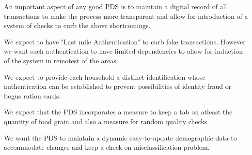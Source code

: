 \documentclass[a4paper,12pt,openany]{book}
\begin{document}
An important aspect of any good PDS is to maintain a digital record of all transactions to make the process more transparent and allow for introduction of a system of checks to curb the above shortcomings.

We expect to have "Last mile Authentication" to curb fake transactions. However we want such authentication to have limited dependencies to allow for induction of the system in remotest of the areas.

We expect to provide each household a distinct identification whose authentication can be established to prevent possibilities of identity fraud or bogus ration cards.

We expect that the PDS incorporates a measure to keep a tab on atleast the quantity of food grain and also a measure for random quality checks.

We want the PDS to maintain a dynamic easy-to-update demographic data to accommodate changes and keep a check on misclassification problem.
\end{document}
